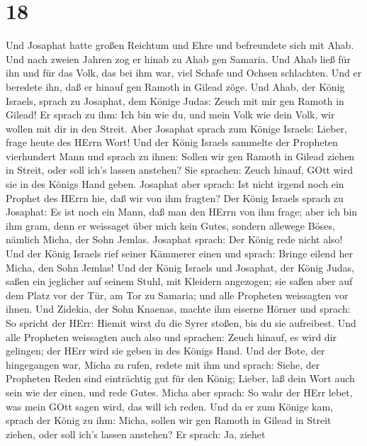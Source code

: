 \hypertarget{section-17}{%
\section{18}\label{section-17}}

 Und Josaphat hatte großen Reichtum und Ehre und befreundete
sich mit Ahab.  Und nach zweien Jahren zog er hinab zu Ahab
gen Samaria. Und Ahab ließ für ihn und für das Volk, das bei ihm war,
viel Schafe und Ochsen schlachten. Und er beredete ihn, daß er hinauf
gen Ramoth in Gilead zöge.  Und Ahab, der König Israels,
sprach zu Josaphat, dem Könige Judas: Zeuch mit mir gen Ramoth in
Gilead! Er sprach zu ihm: Ich bin wie du, und mein Volk wie dein Volk,
wir wollen mit dir in den Streit.  Aber Josaphat sprach zum
Könige Israels: Lieber, frage heute des HErrn Wort!  Und der
König Israels sammelte der Propheten vierhundert Mann und sprach zu
ihnen: Sollen wir gen Ramoth in Gilead ziehen in Streit, oder soll ich's
lassen anstehen? Sie sprachen: Zeuch hinauf, GOtt wird sie in des Königs
Hand geben.  Josaphat aber sprach: Ist nicht irgend noch ein
Prophet des HErrn hie, daß wir von ihm fragten?  Der König
Israels sprach zu Josaphat: Es ist noch ein Mann, daß man den HErrn von
ihm frage; aber ich bin ihm gram, denn er weissaget über mich kein
Gutes, sondern allewege Böses, nämlich Micha, der Sohn Jemlas. Josaphat
sprach: Der König rede nicht also!  Und der König Israels
rief seiner Kämmerer einen und sprach: Bringe eilend her Micha, den Sohn
Jemlas!  Und der König Israels und Josaphat, der König
Judas, saßen ein jeglicher auf seinem Stuhl, mit Kleidern angezogen; sie
saßen aber auf dem Platz vor der Tür, am Tor zu Samaria; und alle
Propheten weissagten vor ihnen.  Und Zidekia, der Sohn
Knaenas, machte ihm eiserne Hörner und sprach: So spricht der HErr:
Hiemit wirst du die Syrer stoßen, bis du sie aufreibest. 
Und alle Propheten weissagten auch also und sprachen: Zeuch hinauf, es
wird dir gelingen; der HErr wird sie geben in des Königs Hand.
 Und der Bote, der hingegangen war, Micha zu rufen, redete
mit ihm und sprach: Siehe, der Propheten Reden sind einträchtig gut für
den König; Lieber, laß dein Wort auch sein wie der einen, und rede
Gutes.  Micha aber sprach: So wahr der HErr lebet, was mein
GOtt sagen wird, das will ich reden.  Und da er zum Könige
kam, sprach der König zu ihm: Micha, sollen wir gen Ramoth in Gilead in
Streit ziehen, oder soll ich's lassen anstehen? Er sprach: Ja, ziehet
